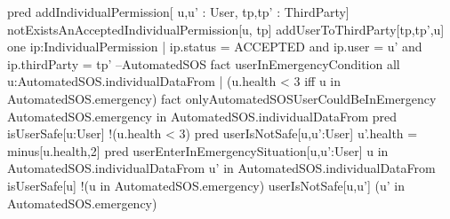 \documentclass[a4paper]{article}
\begin{document}
{{\newline }
\newline 
\newline pred addIndividualPermission[ u,u' : User, tp,tp' : ThirdParty] {
\newline 
\newline 	notExistsAnAcceptedIndividualPermission[u, tp]
\newline 
\newline 	addUserToThirdParty[tp,tp',u]
\newline 
\newline 	one ip:IndividualPermission | ip.status = ACCEPTED and ip.user = u' and ip.thirdParty = tp'
\newline }
\newline 
\newline --AutomatedSOS
\newline 
\newline fact userInEmergencyCondition {
\newline 	all u:AutomatedSOS.individualDataFrom | (u.health < 3  iff u in AutomatedSOS.emergency) 
\newline }
\newline 
\newline fact onlyAutomatedSOSUserCouldBeInEmergency {
\newline 	AutomatedSOS.emergency in AutomatedSOS.individualDataFrom
\newline }
\newline 
\newline pred isUserSafe[u:User] {
\newline 	!(u.health < 3)
\newline }
\newline 
\newline pred userIsNotSafe[u,u':User] {
\newline 	u'.health = minus[u.health,2]
\newline }
\newline 
\newline pred userEnterInEmergencySituation[u,u':User] {
\newline 	u in AutomatedSOS.individualDataFrom
\newline 	u' in AutomatedSOS.individualDataFrom
\newline 	isUserSafe[u]
\newline 	!(u in AutomatedSOS.emergency)
\newline 
\newline 	userIsNotSafe[u,u']
\newline 	(u' in AutomatedSOS.emergency)
}}
\end{document}
